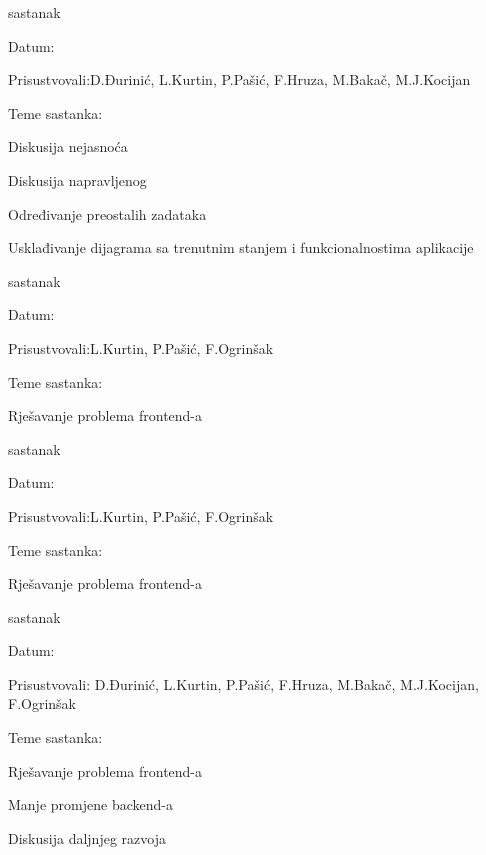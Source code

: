 \begin{packed_enum}
	\item  sastanak
	\item[] \begin{packed_item}
		\item Datum: \sestisastanak
		\item Prisustvovali:D.Đurinić, L.Kurtin, P.Pašić, F.Hruza, M.Bakač, M.J.Kocijan
		\item Teme sastanka:
		\begin{packed_item}
			\item  Diskusija nejasnoća
			\item  Diskusija napravljenog
			\item  Određivanje preostalih zadataka
			\item  Usklađivanje dijagrama sa trenutnim stanjem i funkcionalnostima aplikacije 
		\end{packed_item}
	\end{packed_item}

	\item  sastanak
	\item[] \begin{packed_item}
		\item Datum: \sedmisastanak
		\item Prisustvovali:L.Kurtin, P.Pašić, F.Ogrinšak
		\item Teme sastanka:
		\begin{packed_item}
			\item  Rješavanje problema frontend-a
		\end{packed_item}
	\end{packed_item}
	
	\item  sastanak
	\item[] \begin{packed_item}
		\item Datum: \osmisastanak
		\item Prisustvovali:L.Kurtin, P.Pašić, F.Ogrinšak
		\item Teme sastanka:
		\begin{packed_item}
			\item  Rješavanje problema frontend-a
		\end{packed_item}
	\end{packed_item}		
	
	\item  sastanak
	\item[] \begin{packed_item}
		\item Datum: \devetisastanak
		\item Prisustvovali: D.Đurinić, L.Kurtin, P.Pašić, F.Hruza, M.Bakač, M.J.Kocijan, F.Ogrinšak
		\item Teme sastanka:
		\begin{packed_item}
			\item  Rješavanje problema frontend-a
			\item	Manje promjene backend-a
			\item  Diskusija daljnjeg razvoja
		\end{packed_item}
	\end{packed_item}			


\end{packed_enum}

